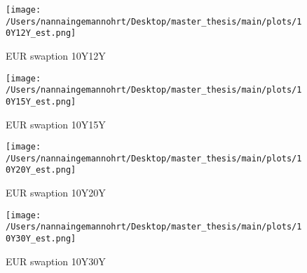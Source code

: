 \begin{figure}[H]
    \centering
    \begin{minipage}{0.5\textwidth}
        \texttt{[image: /Users/nannaingemannohrt/Desktop/master\_thesis/main/plots/10Y12Y\_est.png]}
        \caption{EUR swaption 10Y12Y}
        \label{fig:10Y12Y}
    \end{minipage}\hfill 
    \begin{minipage}{0.5\textwidth}
        \texttt{[image: /Users/nannaingemannohrt/Desktop/master\_thesis/main/plots/10Y15Y\_est.png]}
        \caption{EUR swaption 10Y15Y}
        \label{fig:10Y15Y}
    \end{minipage}

    \centering
    \begin{minipage}{0.5\textwidth}
        \texttt{[image: /Users/nannaingemannohrt/Desktop/master\_thesis/main/plots/10Y20Y\_est.png]}
        \caption{EUR swaption 10Y20Y}
        \label{fig:10Y20Y}
    \end{minipage}\hfill 
    \begin{minipage}{0.5\textwidth}
        \texttt{[image: /Users/nannaingemannohrt/Desktop/master\_thesis/main/plots/10Y30Y\_est.png]}
        \caption{EUR swaption 10Y30Y}
        \label{fig:10Y30Y}
    \end{minipage}
\end{figure}